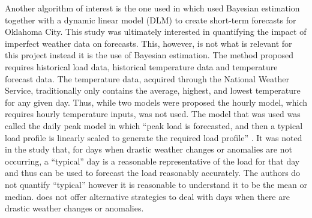 Another algorithm of interest is the one used in \citet{douglas98} which used Bayesian estimation together with a dynamic linear model (DLM) to create short-term forecasts for Oklahoma City. This study was ultimately interested in quantifying the impact of imperfect weather data on forecasts. This, however, is not what is relevant for this project instead it is the use of Bayesian estimation. %
The method proposed requires historical load data, historical temperature data and temperature forecast data. The temperature data, acquired through the National Weather Service, traditionally only contains the average, highest, and lowest temperature for any given day. Thus, while two models were proposed the hourly model, which requires hourly temperature inputs, was not used. The model that was used was called the daily peak model in which ``peak load is forecasted, and then a typical load profile is linearly scaled to generate the required load profile'' \citep{douglas98}. It was noted in the study that, for days when drastic weather changes or anomalies are not occurring, a ``typical'' day is a reasonable representative of the load for that day and thus can be used to forecast the load reasonably accurately. The authors do not quantify ``typical'' however it is reasonable to understand it to be the mean or median. \cite{douglas98} does not offer alternative strategies to deal with days when there are drastic weather changes or anomalies. %
